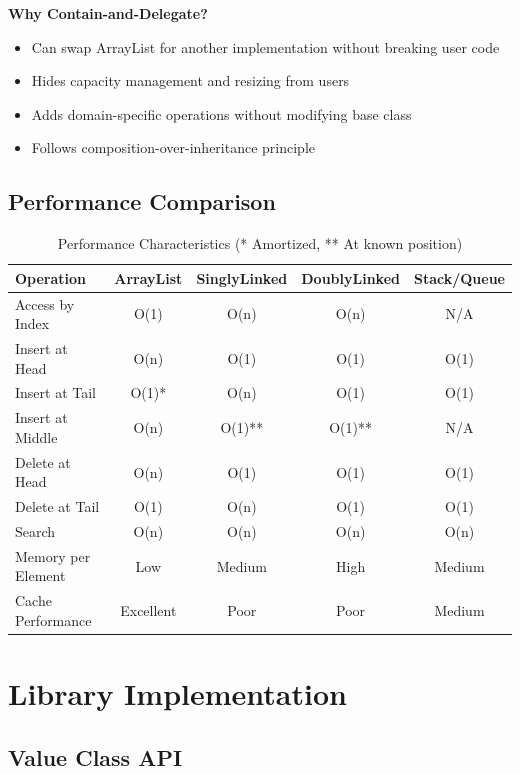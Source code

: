 \documentclass[11pt,a4paper]{article}
\begin{document}
\textbf{Why Contain-and-Delegate?}
\begin{itemize}
    \item Can swap ArrayList for another implementation without breaking user code
    \item Hides capacity management and resizing from users
    \item Adds domain-specific operations without modifying base class
    \item Follows composition-over-inheritance principle
\end{itemize}

\subsection{Performance Comparison}

\begin{table}[H]
\centering
\begin{tabular}{|l|c|c|c|c|}
\hline
\textbf{Operation} & \textbf{ArrayList} & \textbf{SinglyLinked} & \textbf{DoublyLinked} & \textbf{Stack/Queue} \\
\hline
Access by Index & O(1) & O(n) & O(n) & N/A \\
Insert at Head & O(n) & O(1) & O(1) & O(1) \\
Insert at Tail & O(1)* & O(n) & O(1) & O(1) \\
Insert at Middle & O(n) & O(1)** & O(1)** & N/A \\
Delete at Head & O(n) & O(1) & O(1) & O(1) \\
Delete at Tail & O(1) & O(n) & O(1) & O(1) \\
Search & O(n) & O(n) & O(n) & O(n) \\
Memory per Element & Low & Medium & High & Medium \\
Cache Performance & Excellent & Poor & Poor & Medium \\
\hline
\end{tabular}
\caption{Performance Characteristics (* Amortized, ** At known position)}
\label{tab:performance}
\end{table}

\section{Library Implementation}

\subsection{Value Class API}
\end{document}
